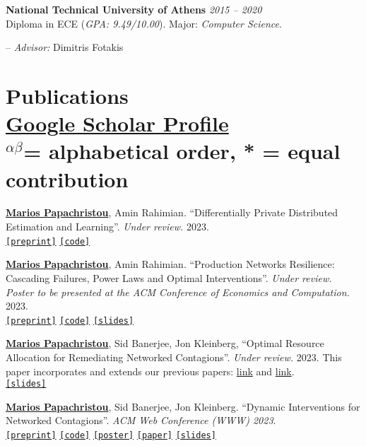\documentclass[margin]{res}
\newcommand{\field}[2]{\noindent \textbf{#1} \hfill #2 \\}
\newcommand{\alphabeticalorder}[0]{\ensuremath {^{\alpha \beta}}}
\newcommand{\specialurl}[2]{\href {#2} {\texttt{[#1]}}}
\newcommand{\preprint}[1]{\specialurl {preprint} {#1}}
\newcommand{\code}[1]{\specialurl {code} {#1}}
\newcommand{\slides}[1]{\specialurl {slides} {#1}}
\newcommand{\poster}[1]{\specialurl {poster} {#1}}
\newcommand{\paper}[1]{\specialurl {paper} {#1}}
\newcommand{\authorref}[1]{\underline {\textbf{#1}}}
\newcommand{\authorme}{\authorref{Marios Papachristou}}
\begin{document}
\begin{resume}
\field{National Technical University of Athens}  {\emph{2015 -- 2020}} 
Diploma in ECE (\emph{GPA: 9.49/10.00}). Major: \emph{Computer Science}.
\begin{compactitem}
\item[--] \emph{Advisor:} Dimitris Fotakis

\end{compactitem} 

\section{Publications\\ {
\footnotesize
\textup{\href{https://scholar.google.gr/citations?user=T12JO3MAAAAJ&hl=en}{Google Scholar Profile}} \\\alphabeticalorder  = \textup{alphabetical order}, * = \textup{equal contribution}
}}


\begin{compactenum}
   \item \authorme, Amin Rahimian. ``Differentially Private Distributed Estimation and Learning''. \emph{Under review.} 2023. \\
   	   \preprint{https://arxiv.org/abs/2306.15865} \code{https://github.com/papachristoumarios/dp-distributed-estimation}
   \item \authorme, Amin Rahimian. ``Production Networks Resilience: Cascading Failures, Power Laws and Optimal Interventions''. \emph{Under review. Poster to be presented at the ACM Conference of Economics and Computation.} 2023. \\ \preprint{https://papers.ssrn.com/sol3/papers.cfm?abstract_id=4392226} \code{https://github.com/papachristoumarios/supply-chain-resilience} \slides{https://docs.google.com/presentation/d/1x5IcLvLxY31GME19li0HUgktC9HlEe2u/edit?usp=sharing&ouid=109899272296285628946&rtpof=true&sd=true}
   \item \authorme, Sid Banerjee, Jon Kleinberg, ``Optimal Resource Allocation for Remediating Networked Contagions''. \emph{Under review.} 2023. This paper incorporates and extends our previous papers: \href{https://doi.org/10.1145/3485447.3512047}{link} and \href{https://arxiv.org/abs/2205.13394}{link}. \\
       \slides{https://drive.google.com/file/d/1DgOCnJ5Pf3Je-F7a-Adiy2TTZ7oZUbbB/view?usp=sharing}  
 
   \item \authorme, Sid Banerjee, Jon Kleinberg. ``Dynamic Interventions for Networked Contagions''. \emph{ACM Web Conference (WWW) 2023}. \\
		\preprint{https://arxiv.org/abs/2205.13394} \code{https://github.com/papachristoumarios/dynamic-clearing} \poster{https://drive.google.com/file/d/1l0TCsoZNo3NoOOHsPSh1ofctXD4ivFir/view?usp=sharing}
		\paper{https://dl.acm.org/doi/abs/10.1145/3543507.3583470}
		\slides{https://drive.google.com/file/d/1ZZ6F6PFNsBjYKFyurkwM2IbenuzXJEAs/view?usp=share_link}


\end{compactenum}
\end{resume}
\end{document}
